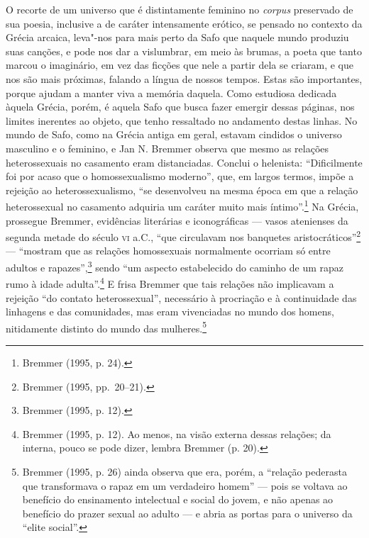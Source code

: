 O recorte de um universo que é distintamente feminino no \textit{corpus} preservado de sua poesia, inclusive
a de caráter intensamente erótico, se pensado no contexto da Grécia arcaica, leva"-nos para mais perto da Safo que naquele mundo produziu suas canções, e pode nos dar a vislumbrar, em meio às brumas, a poeta que tanto marcou o imaginário, em vez das ficções que nele a partir dela se criaram, e que nos são mais próximas, falando a língua de nossos tempos. Estas são importantes, porque ajudam a manter viva a memória daquela. Como estudiosa dedicada àquela Grécia, porém, é aquela Safo que busca fazer emergir dessas páginas, nos limites inerentes ao objeto, que tenho ressaltado no andamento destas linhas. No mundo
de Safo, como na Grécia antiga em geral, estavam cindidos o universo masculino
e o feminino, e Jan N. Bremmer observa que mesmo as relações
heterossexuais no casamento eram distanciadas. Conclui o helenista:
“Dificilmente foi por acaso que o homossexualismo moderno”, que, em largos termos, impõe
a rejeição ao heterossexualismo, “se desenvolveu na mesma época em que a
relação heterossexual no casamento adquiria um caráter muito mais íntimo”.\footnote{ Bremmer (1995, p. 24).} Na
Grécia, prossegue Bremmer, evidências literárias e iconográficas --- vasos
atenienses da segunda metade do século \textsc{vi} a.C., “que circulavam nos banquetes
aristocráticos”\footnote{ Bremmer (1995, pp.~20--21).} --- “mostram que as relações homossexuais normalmente
ocorriam só entre adultos e rapazes”,\footnote{ Bremmer (1995, p. 12).} sendo “um aspecto estabelecido do
caminho de um rapaz rumo à idade adulta”.\footnote{ Bremmer (1995, p. 12). Ao menos, na visão
externa dessas relações; da interna, pouco se pode dizer, lembra Bremmer (p.
20).} E frisa Bremmer que tais relações não implicavam a rejeição “do contato
heterossexual”, necessário à procriação e à continuidade das linhagens e das
comunidades, mas eram vivenciadas no mundo dos homens, nitidamente distinto do
mundo das mulheres.\footnote{ Bremmer (1995, p. 26) ainda observa que era,
porém, a “relação pederasta que transformava o rapaz em um verdadeiro homem” ---
pois se voltava ao benefício do ensinamento intelectual e social do jovem, e
não apenas ao benefício do prazer sexual ao adulto --- e abria as portas para o
universo da “elite social”.}

